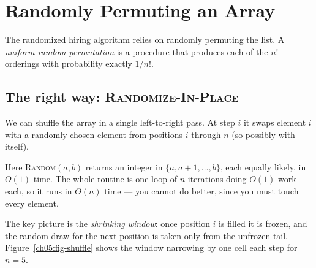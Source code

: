 \section{Randomly Permuting an Array}
\label{ch05:permute}

The randomized hiring algorithm relies on randomly permuting the list. A \emph{uniform random permutation} is a procedure that produces each of the $n!$ orderings with probability exactly $1/n!$.

\subsection*{The right way: \textsc{Randomize-In-Place}}

We can shuffle the array in a single left-to-right pass. At step $i$
it swaps element $i$ with a randomly chosen element from positions $i$ through
$n$ (so possibly with itself).

\begin{algorithm}[htbp]
\caption{\textsc{Randomize-In-Place}$(A, n)$}
\end{algorithm}

Here \textsc{Random}$(a,b)$ returns an integer in $\{a, a+1, \dots, b\}$, each
equally likely, in $O(1)$ time. The whole routine is one loop of $n$ iterations
doing $O(1)$ work each, so it runs in $\Theta(n)$ time --- you cannot do better,
since you must touch every element.

The key picture is the \emph{shrinking window}: once position $i$ is filled it is
frozen, and the random draw for the next position is taken only from the unfrozen
tail. Figure~\ref{ch05:fig-shuffle} shows the window narrowing by one cell each
step for $n = 5$.

